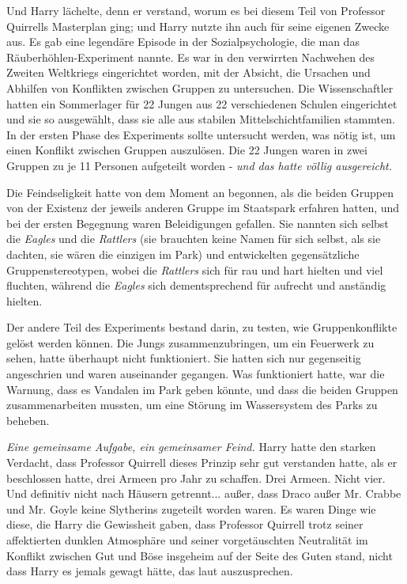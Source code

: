 Und Harry lächelte, denn er verstand, worum es bei diesem Teil von Professor
Quirrells Masterplan ging; und Harry nutzte ihn auch für seine eigenen Zwecke
aus. Es gab eine legendäre Episode in der Sozialpsychologie, die man das
Räuberhöhlen-Experiment nannte. Es war in den verwirrten Nachwehen des Zweiten
Weltkriegs eingerichtet worden, mit der Absicht, die Ursachen und Abhilfen von
Konflikten zwischen Gruppen zu untersuchen. Die Wissenschaftler hatten ein
Sommerlager für 22 Jungen aus 22 verschiedenen Schulen eingerichtet und sie so
ausgewählt, dass sie alle aus stabilen Mittelschichtfamilien stammten. In der
ersten Phase des Experiments sollte untersucht werden, was nötig ist, um einen
Konflikt zwischen Gruppen auszulösen. Die 22 Jungen waren in zwei Gruppen zu je
11 Personen aufgeteilt worden - \emph{und das hatte völlig ausgereicht.}

Die Feindseligkeit hatte von dem Moment an begonnen, als die beiden Gruppen von
der Existenz der jeweils anderen Gruppe im Staatspark erfahren hatten, und bei
der ersten Begegnung waren Beleidigungen gefallen. Sie nannten sich selbst die
\emph{Eagles} und die \emph{Rattlers} (sie brauchten keine Namen für sich
selbst, als sie dachten, sie wären die einzigen im Park) und entwickelten
gegensätzliche Gruppenstereotypen, wobei die \emph{Rattlers} sich für rau und
hart hielten und viel fluchten, während die \emph{Eagles} sich dementsprechend
für aufrecht und anständig hielten.

Der andere Teil des Experiments bestand darin, zu testen, wie Gruppenkonflikte
gelöst werden können. Die Jungs zusammenzubringen, um ein Feuerwerk zu sehen,
hatte überhaupt nicht funktioniert. Sie hatten sich nur gegenseitig angeschrien
und waren auseinander gegangen. Was funktioniert hatte, war die Warnung, dass es
Vandalen im Park geben könnte, und dass die beiden Gruppen zusammenarbeiten
mussten, um eine Störung im Wassersystem des Parks zu beheben.

\emph{ Eine gemeinsame Aufgabe, ein gemeinsamer Feind.} Harry hatte den starken
Verdacht, dass Professor Quirrell dieses Prinzip sehr gut verstanden hatte, als
er beschlossen hatte, drei Armeen pro Jahr zu schaffen. Drei Armeen. Nicht vier.
Und definitiv nicht nach Häusern getrennt... außer, dass Draco außer Mr. Crabbe
und Mr. Goyle keine Slytherins zugeteilt worden waren. Es waren Dinge wie diese,
die Harry die Gewissheit gaben, dass Professor Quirrell trotz seiner
affektierten dunklen Atmosphäre und seiner vorgetäuschten Neutralität im
Konflikt zwischen Gut und Böse insgeheim auf der Seite des Guten stand, nicht
dass Harry es jemals gewagt hätte, das laut auszusprechen.


